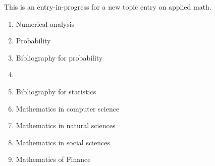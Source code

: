 \documentclass[12pt]{article}
\begin{document}
This is an entry-in-progress for a new topic entry on applied math.

\begin{enumerate}
\item Numerical analysis
\item Probability
\item Bibliography for probability
\item {}
\item Bibliography for statistics
\item Mathematics in computer science
\item Mathematics in natural sciences
\item Mathematics in social sciences
\item Mathematics of Finance
\end{enumerate}
\end{document}
